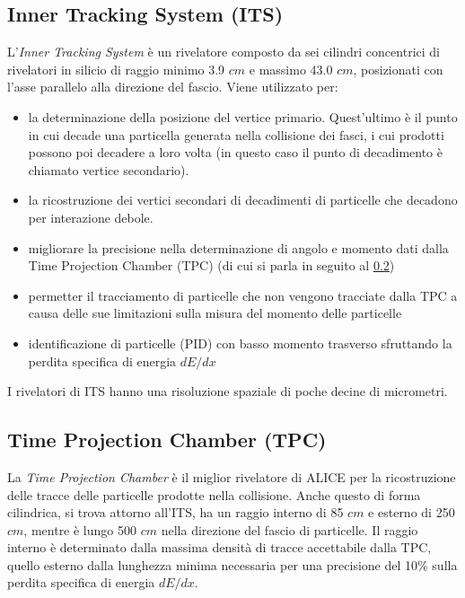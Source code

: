    \subsection{Inner Tracking System (ITS)} \label{ITS}
    L'\textit{Inner Tracking System} è un rivelatore composto da sei cilindri concentrici di rivelatori in silicio di raggio minimo 3.9 $cm$ e massimo 43.0 $cm$, posizionati con l'asse parallelo alla direzione del fascio. Viene utilizzato per:
    \begin{itemize}
        \item la determinazione della posizione del vertice primario. Quest'ultimo è il punto in cui decade una particella generata nella collisione dei fasci, i cui prodotti possono poi decadere a loro volta (in questo caso il punto di decadimento è chiamato vertice secondario). %
        \item la ricostruzione dei vertici secondari di decadimenti di particelle che decadono per interazione debole. 
        \item migliorare la precisione nella determinazione di angolo e momento dati dalla Time Projection Chamber (TPC) (di cui si parla in seguito al \ref{TPC})
        \item permetter il tracciamento di particelle che non vengono tracciate dalla TPC a causa delle sue limitazioni sulla misura del momento delle particelle
        \item identificazione di particelle (PID) con basso momento trasverso sfruttando la perdita specifica di energia $dE/dx$
    \end{itemize}
    
    I rivelatori di ITS hanno una risoluzione spaziale di poche decine di micrometri. 
    
    \subsection{Time Projection Chamber  (TPC)} \label{TPC}
    La \textit{Time Projection Chamber}  è il miglior rivelatore di ALICE per la ricostruzione delle tracce delle particelle prodotte nella collisione. Anche questo di forma cilindrica, si trova attorno all'ITS, ha un raggio interno di 85 $cm$ e esterno di 250 $cm$, mentre è lungo 500 $cm$ nella direzione del fascio di particelle. Il raggio interno è determinato dalla massima densità di tracce accettabile dalla TPC, quello esterno dalla lunghezza minima necessaria per una precisione del 10$\%$ sulla perdita specifica di energia $dE/dx$. 
     
